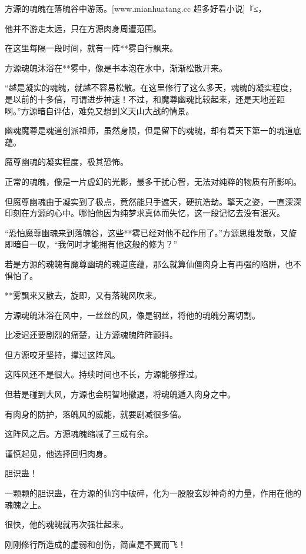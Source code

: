 
\begin{this_body}

方源的魂魄在落魄谷中游荡。[www.mianhuatang.cc 超多好看小说]『≤，

他并不游走太远，只在方源肉身周遭范围。

在这里每隔一段时间，就有一阵**雾自行飘来。

方源魂魄沐浴在**雾中，像是书本泡在水中，渐渐松散开来。

“越是凝实的魂魄，就越不容易松散。在这里修行了这么多天，魂魄的凝实程度，是以前的十多倍，可谓进步神速！不过，和魔尊幽魂比较起来，还是天地差距啊。”方源暗自评估，难免又想到义天山大战的情景。

幽魂魔尊是魂道创派祖师，虽然身陨，但是留下的魂魄，却有着天下第一的魂道底蕴。

魔尊幽魂的凝实程度，极其恐怖。

正常的魂魄，像是一片虚幻的光影，最多干扰心智，无法对纯粹的物质有所影响。

但魔尊幽魂由于凝实到了极点，竟然能只手遮天，硬抗浩劫。擎天之姿，一直深深印刻在方源的心中。哪怕他因为纯梦求真体而失忆，这一段记忆去没有泯灭。

“恐怕魔尊幽魂来到落魄谷，这些**雾已经对他不起作用了。”方源思维发散，又旋即暗自一叹，“我何时才能拥有他这般的修为？”

若是方源的魂魄有魔尊幽魂的魂道底蕴，那么就算仙僵肉身上有再强的陷阱，也不惧怕了。

**雾飘来又散去，旋即，又有落魄风吹来。

方源魂魄沐浴在风中，一丝丝的风，像是钢丝，将他的魂魄分离切割。

比凌迟还要剧烈的痛楚，让方源魂魄阵阵颤抖。

但方源咬牙坚持，撑过这阵风。

这阵风还不是很大。持续时间也不长，方源能够撑过。

但若是碰到大风，方源也会明智地撤退，将魂魄遁入肉身之中。

有肉身的防护，落魄风的威能，就要剧减很多倍。

这阵风之后。方源魂魄缩减了三成有余。

谨慎起见，他选择回归肉身。

胆识蛊！

一颗颗的胆识蛊，在方源的仙窍中破碎，化为一股股玄妙神奇的力量，作用在他的魂魄之上。

很快，他的魂魄就再次强壮起来。

刚刚修行所造成的虚弱和创伤，简直是不翼而飞！


\end{this_body}
